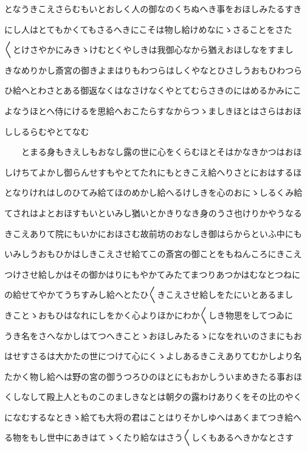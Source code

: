 \documentclass[a4paper,11pt,landscape]{ltjtarticle}
\begin{document}
\par\medskip
となうきこえさらむもいとおしく人の御なのくちぬへき事をおほしみたるすき
\par\medskip
にし人はとてもかくてもさるへきにこそは物し給けめなにゝさることをさた
\par\medskip
〱とけさやかにみきゝけむとくやしきは我御心なから猶えおほしなをすまし
\par\medskip
きなめりかし斎宮の御きよまはりもわつらはしくやなとひさしうおもひわつら
\par\medskip
ひ給へとわさとある御返なくはなさけなくやとてむらさきのにはめるかみにこ
\par\medskip
よなうほとへ侍にけるを思給へおこたらすなからつゝましきほとはさらはおほ
\par\medskip
ししるらむやとてなむ
\par\medskip
　　とまる身もきえしもおなし露の世に心をくらむほとそはかなきかつはおほ
\par\medskip
しけちてよかし御らんせすもやとてたれにもときこえ給へりさとにおはするほ
\par\medskip
となりけれはしのひてみ給てほのめかし給へるけしきを心のおにゝしるくみ給
\par\medskip
てされはよとおほすもいといみし猶いとかきりなき身のうさ也けりかやうなる
\par\medskip
きこえありて院にもいかにおほさむ故前坊のおなしき御はらからといふ中にも
\par\medskip
いみしうおもひかはしきこえさせ給てこの斎宮の御ことをもねんころにきこえ
\par\medskip
つけさせ給しかはその御かはりにもやかてみたてまつりあつかはむなとつねに
\par\medskip
の給せてやかてうちすみし給へとたひ〱きこえさせ給しをたにいとあるまし
\par\medskip
きことゝおもひはなれにしをかく心よりほかにわか〱しき物思をしてつゐに
\par\medskip
うき名をさへなかしはてつへきことゝおほしみたるゝになをれいのさまにもお
\par\medskip
はせすさるは大かたの世につけて心にくゝよしあるきこえありてむかしより名
\par\medskip
たかく物し給へは野の宮の御うつろひのほとにもおかしういまめきたる事おほ
\par\medskip
くしなして殿上人とものこのましきなとは朝夕の露わけありくをその比のやく
\par\medskip
になむするなときゝ給ても大将の君はことはりそかしゆへはあくまてつき給へ
\par\medskip
る物をもし世中にあきはてゝくたり給なはさう〱しくもあるへきかなとさす
\end{document}
